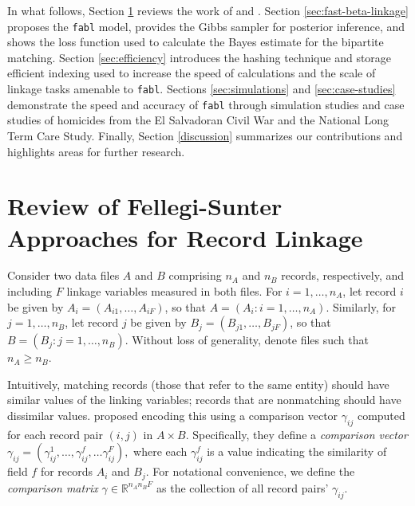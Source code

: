 \documentclass[ba]{imsart}
\begin{document}
In what follows, Section \ref{sec:review-of_prior-work} reviews the work of \cite{fellegi_theory_1969} and \cite{sadinle_bayesian_2017}. Section \ref{sec:fast-beta-linkage} proposes the \texttt{fabl} model, provides the Gibbs sampler for posterior inference, and shows the loss function used to calculate the Bayes estimate for the bipartite matching. Section \ref{sec:efficiency} introduces the hashing technique and storage efficient indexing used to increase the speed of calculations and the scale of linkage tasks amenable to \texttt{fabl}. Sections \ref{sec:simulations} and \ref{sec:case-studies} demonstrate the speed and accuracy of \texttt{fabl} through simulation studies and case studies of homicides from the El Salvadoran Civil War and the National Long Term Care Study. Finally, Section \ref{discussion} summarizes our contributions and highlights areas for further research.

\section{Review of Fellegi-Sunter Approaches for Record Linkage}
\label{sec:review-of_prior-work}

Consider two data files $A$ and $B$ comprising $n_A$ and $n_B$ records, respectively, and including $F$ linkage variables measured in both files. For $i=1, \dots, n_A$, let record $i$ be given by $A_i = (A_{i1}, \dots, A_{iF})$, so that $A = (A_i : i = 1, \dots, n_A)$.  Similarly, for $j=1, \dots, n_B$, let record $j$ be given by $B_j = (B_{j1}, \dots, B_{jF})$, so that $B = (B_j : j = 1, \dots, n_B)$.  Without loss of generality, denote files such that $n_A \geq n_B$.


Intuitively, matching records (those that refer to the same entity) should have similar values of the linking variables; records that are nonmatching should have dissimilar values. \cite{fellegi_theory_1969} proposed encoding this using a comparison vector $\gamma_{ij}$ computed for each record pair $(i,j)$ in $A \times B.$  Specifically, they define a \emph{comparison vector} $\gamma_{ij} = (\gamma_{ij}^1, \ldots, \gamma_{ij}^f, \ldots \gamma_{ij}^F),$ where each $\gamma_{ij}^f$ is a value indicating the similarity of field $f$ for records $A_i$ and $B_j$. For notational convenience, we define the \emph{comparison matrix} $\gamma \in \mathbb{R}^{n_A n_B F}$ as the collection of all record pairs' $\gamma_{ij}$.  
\end{document}
